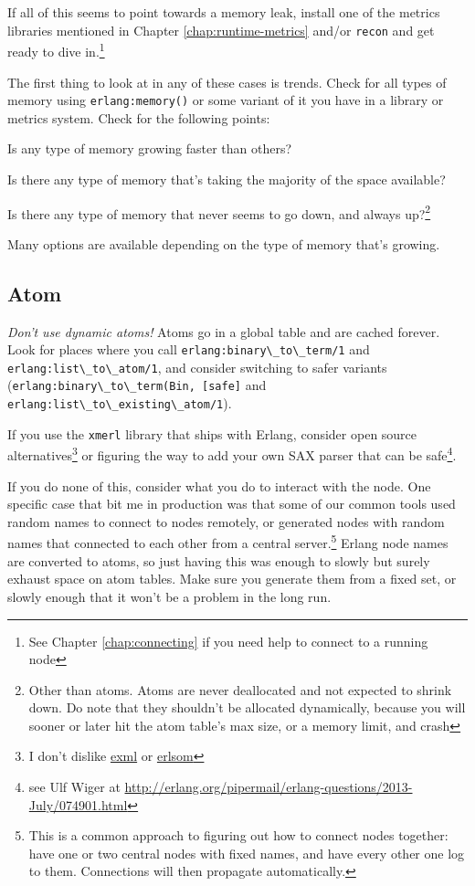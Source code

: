 \documentclass[11pt, oneside]{book}   	%
\newcommand{\otpapp}[1]{\Verb`#1`}
\newcommand{\function}[1]{\Verb`#1`}
\newcommand{\expression}[1]{\Verb`#1`}
\begin{document}
If all of this seems to point towards a memory leak, install one of the metrics libraries mentioned in Chapter \ref{chap:runtime-metrics} and/or \otpapp{recon} and get ready to dive in.\footnote{See Chapter \ref{chap:connecting} if you need help to connect to a running node}

The first thing to look at in any of these cases is trends. Check for all types of memory using \expression{erlang:memory()} or some variant of it you have in a library or metrics system. Check for the following points:

\begin{itemize*}
	\item Is any type of memory growing faster than others?
	\item Is there any type of memory that's taking the majority of the space available?
	\item Is there any type of memory that never seems to go down, and always up?\footnote{Other than atoms. Atoms are never deallocated and not expected to shrink down. Do note that they shouldn't be allocated dynamically, because you will sooner or later hit the atom table's max size, or a memory limit, and crash}
\end{itemize*}

Many options are available depending on the type of memory that's growing.

\subsection{Atom}

\emph{Don't use dynamic atoms!} Atoms go in a global table and are cached forever. Look for places where you call \function{erlang:binary\_to\_term/1} and \function{erlang:list\_to\_atom/1}, and consider switching to safer variants (\expression{erlang:binary\_to\_term(Bin, [safe]} and \function{erlang:list\_to\_existing\_atom/1}).

If you use the \otpapp{xmerl} library that ships with Erlang, consider open source alternatives\footnote{I don't dislike \href{https://github.com/paulgray/exml}{exml} or \href{https://github.com/willemdj/erlsom}{erlsom}} or figuring the way to add your own SAX parser that can be safe\footnote{see Ulf Wiger at \href{http://erlang.org/pipermail/erlang-questions/2013-July/074901.html}{http://erlang.org/pipermail/erlang-questions/2013-July/074901.html}}. 

If you do none of this, consider what you do to interact with the node. One specific case that bit me in production was that some of our common tools used random names to connect to nodes remotely, or generated nodes with random names that connected to each other from a central server.\footnote{This is a common approach to figuring out how to connect nodes together: have one or two central nodes with fixed names, and have every other one log to them. Connections will then propagate automatically.} Erlang node names are converted to atoms, so just having this was enough to slowly but surely exhaust space on atom tables. Make sure you generate them from a fixed set, or slowly enough that it won't be a problem in the long run.
\end{document}
